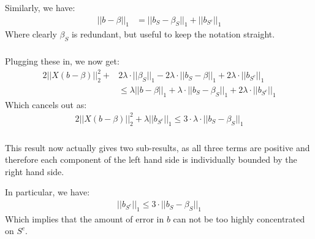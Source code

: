 \begin{frame}[fragile] \frametitle{}

Similarly, we have:
\begin{align*}
|| b - \beta ||_1 &= || b_S - \beta_S ||_1 + || b_{S^c} ||_1
\end{align*}
Where clearly $\beta_S$ is redundant, but useful to keep the
notation straight.

\end{frame}

\begin{frame}[fragile] \frametitle{}

Plugging these in, we now get:
\begin{align*}
2 || X (b - \beta) ||_2^2 + &2 \lambda \cdot || \beta_S ||_1 - 2 \lambda \cdot || b_S - \beta ||_1
  + 2 \lambda \cdot || b_{S^c} ||_1 \\
&\leq \lambda || b - \beta ||_1 + \lambda \cdot || b_S - \beta_S ||_1 + 2 \lambda \cdot || b_{S^c} ||_1
\end{align*}
\pause Which cancels out as:
\begin{align*}
2 || X (b - \beta) ||_2^2 + \lambda || b_{S^c} ||_1 \leq 3 \cdot \lambda \cdot || b_S - \beta_S ||_1
\end{align*}

\end{frame}

\begin{frame}[fragile] \frametitle{}

This result now actually gives two sub-results, as all three terms are positive and
therefore each component of the left hand side is individually bounded by the right
hand side.

\pause In particular, we have:
\begin{align*}
|| b_{S^c} ||_1 \leq 3 \cdot || b_S - \beta_S ||_1
\end{align*}
Which implies that the amount of error in $b$ can not be too highly concentrated
on $S^c$.

\end{frame}

